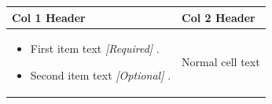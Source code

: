 \documentclass[11pt,a4paper]{article}
\begin{document}
\begin{table}[h]
\begin{tabular}{|l|l|}
\hline
Col 1 Header & Col 2 Header \\ \hline
\begin{itemize} \item First item text \textit{[Required]} . \item Second item text \textit{[Optional]} . \end{itemize} & Normal cell text \\ \hline
\end{tabular}
\end{table}
\end{document}
